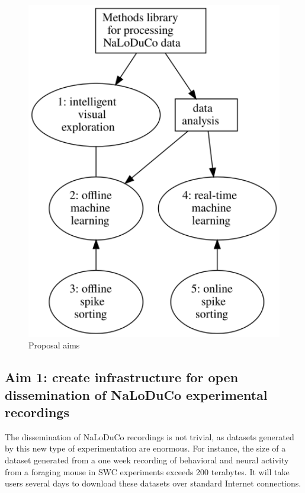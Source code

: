 \documentclass[12pt]{article}
\begin{document}
\begin{figure}
    \begin{center}
        \includegraphics[width=5in]{figures/aims.png}
    \end{center}
    \caption{Proposal aims}
    \label{fig:aims}
\end{figure}

\subsection*{Aim 1: create infrastructure for open dissemination of NaLoDuCo
experimental recordings}

The dissemination of NaLoDuCo recordings is not
trivial, as datasets generated by this new type of experimentation are
enormous. For instance, the size of a dataset generated from a one week
recording of behavioral and neural activity from a foraging mouse in SWC
experiments exceeds 200 terabytes. It will take users several days to download
these datasets over standard Internet connections.
\end{document}
